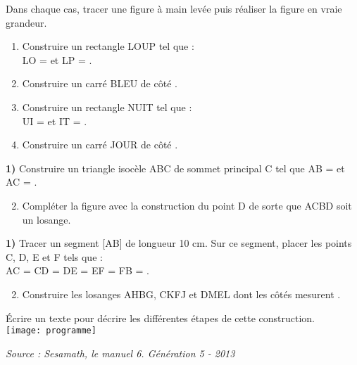\begin{colonne*exercice}
\begin{exercice} %
   Dans chaque cas, tracer une figure à main levée puis réaliser la figure en vraie grandeur.
   \begin{enumerate}
      \item Construire un rectangle LOUP tel que : \\
      LO =  et LP = .
      \item Construire un carré BLEU de côté .
      \item Construire un rectangle NUIT tel que : \\
      UI =  et IT = .
      \item Construire un carré JOUR de côté .
   \end{enumerate}
\end{exercice}

\smallskip

\begin{exercice} %
   {\bf\textcolor{A1}{1)}} Construire un triangle isocèle ABC de sommet principal C tel que AB =  et AC = .
   \begin{enumerate}
   \setcounter{enumi}{1}
      \item Compléter la figure avec la construction du point D de sorte que ACBD soit un losange.
   \end{enumerate}
\end{exercice}

\smallskip

\begin{exercice} %
   {\bf\textcolor{A1}{1)}} Tracer un segment [AB] de longueur 10 cm. Sur ce segment, placer les points C, D, E et F tels que : \\
   AC = CD = DE = EF = FB = .
   \begin{enumerate}
   \setcounter{enumi}{1}
      \item Construire les losanges AHBG, CKFJ et DMEL dont les côtés mesurent .
   \end{enumerate}
\end{exercice}

\smallskip

\begin{exercice} %
   Écrire un texte pour décrire les différentes étapes de cette construction. \\ [2mm]
      \texttt{[image: programme]}
\end{exercice}
\hfill {\it\footnotesize Source : Sesamath, le manuel 6. Génération 5 - 2013}
\end{colonne*exercice}


